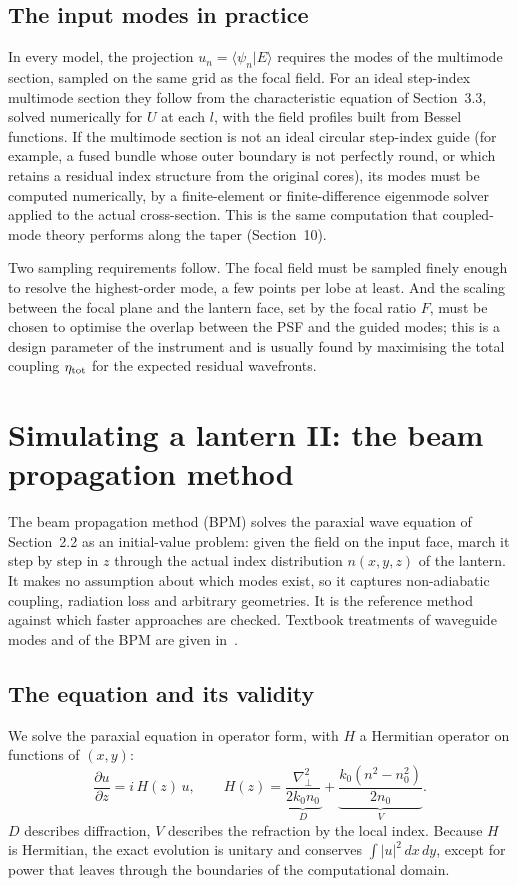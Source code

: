\documentclass[11pt,a4paper]{article}
\newcommand{\braket}[2]{\langle #1|#2\rangle}
\begin{document}
\subsection{The input modes in practice}
In every model, the projection $u_n = \braket{\psi_n}{E}$ requires the modes of the multimode section, sampled on the same grid as the focal field. For an ideal step-index multimode section they follow from the characteristic equation of Section~3.3, solved numerically for $U$ at each $l$, with the field profiles built from Bessel functions. If the multimode section is not an ideal circular step-index guide (for example, a fused bundle whose outer boundary is not perfectly round, or which retains a residual index structure from the original cores), its modes must be computed numerically, by a finite-element or finite-difference eigenmode solver applied to the actual cross-section. This is the same computation that coupled-mode theory performs along the taper (Section~10).

Two sampling requirements follow. The focal field must be sampled finely enough to resolve the highest-order mode, a few points per lobe at least. And the scaling between the focal plane and the lantern face, set by the focal ratio $F$, must be chosen to optimise the overlap between the PSF and the guided modes; this is a design parameter of the instrument and is usually found by maximising the total coupling $\eta_{\rm tot}$ for the expected residual wavefronts.

\section{Simulating a lantern II: the beam propagation method}

The beam propagation method (BPM) solves the paraxial wave equation of Section~2.2 as an initial-value problem: given the field on the input face, march it step by step in $z$ through the actual index distribution $n(x,y,z)$ of the lantern. It makes no assumption about which modes exist, so it captures non-adiabatic coupling, radiation loss and arbitrary geometries. It is the reference method against which faster approaches are checked. Textbook treatments of waveguide modes and of the BPM are given in~\cite{SnyderLove,Okamoto2006}.

\subsection{The equation and its validity}
We solve the paraxial equation in operator form, with $H$ a Hermitian operator on functions of $(x,y)$:
\begin{equation}
\frac{\partial u}{\partial z} = i\, H(z)\, u,
\qquad
H(z) = \underbrace{\frac{\nabla_\perp^2}{2 k_0 n_0}}_{D} + \underbrace{\frac{k_0\left(n^2 - n_0^2\right)}{2 n_0}}_{V}.
\label{eq:bpm_op}
\end{equation}
$D$ describes diffraction, $V$ describes the refraction by the local index. Because $H$ is Hermitian, the exact evolution is unitary and conserves $\int |u|^2\,dx\,dy$, except for power that leaves through the boundaries of the computational domain.
\end{document}
